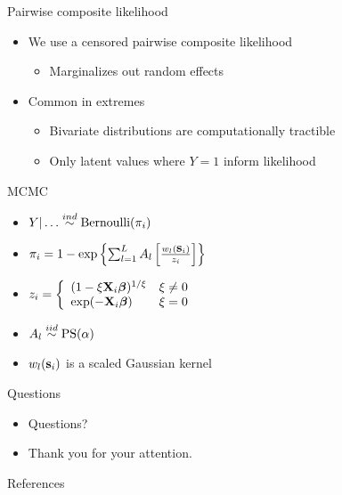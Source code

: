 \documentclass{beamer}
\begin{document}
\begin{frame}{Pairwise composite likelihood}
  \begin{itemize}
    \item We use a censored pairwise composite likelihood
    \begin{itemize}
      \item Marginalizes out random effects
    \end{itemize}
    \item Common in extremes
    \begin{itemize}
      \item Bivariate distributions are computationally tractible
      \item Only latent values where $Y = 1$ inform likelihood
    \end{itemize}
  \end{itemize}
\end{frame}

\begin{frame}{MCMC}
  \begin{itemize}
    \item $Y | \ldots \stackrel{ind}{\sim} \text{Bernoulli}(\pi_i)$
    \item $\pi_i = 1 - \exp\left\{ \sum_{l = 1}^L A_l \left[\frac{ w_l (\mbox{\bf s}_i) }{z_i} \right] \right\}$
    \item $z_i = \left\{ \begin{array}{ll}
      (1 - \xi \mbox{\bf X}_i \mbox{\boldmath $\beta$})^{1 / \xi} & \xi \neq 0 \\
      \exp(-\mbox{\bf X}_i \mbox{\boldmath $\beta$}) & \xi = 0
      \end{array} \right.$
    \item $A_l \stackrel{iid}{\sim} \text{PS}(\alpha)$
    \item $w_l(\mbox{\bf s}_i)$ is a scaled Gaussian kernel
  \end{itemize}
\end{frame}

\begin{frame}{Questions}
  \begin{itemize} \setlength{\itemsep}{0.5em}
    \item Questions?
    \item Thank you for your attention.
  \end{itemize}
\end{frame}

\begin{frame}{References}

\end{frame}
\end{document}
